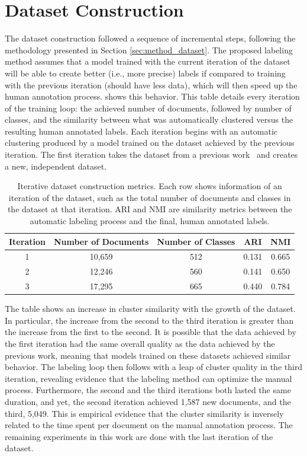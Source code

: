 \section{Dataset Construction}
\label{sec:res_dataset}

The dataset construction followed a sequence of incremental steps, following the methodology presented in Section \ref{sec:method_dataset}. The proposed labeling method assumes that a model trained with the current iteration of the dataset will be able to create better (i.e., more precise) labels if compared to training with the previous iteration (should have less data), which will then speed up the human annotation process.  shows this behavior. This table details every iteration of the training loop: the achieved number of documents, followed by number of classes, and the similarity between what was automatically clustered versus the resulting human annotated labels. Each iteration begins with an automatic clustering produced by a model trained on the dataset achieved by the previous iteration. The first iteration takes the dataset from a previous work~\cite{10.1007/978-3-032-09368-4_12} and creates a new, independent dataset.

\begin{table}[ht]
\centering
\caption{Iterative dataset construction metrics. Each row shows information of an iteration of the dataset, such as the total number of documents and classes in the dataset at that iteration. ARI and NMI are similarity metrics between the automatic labeling process and the final, human annotated labels.}
\label{tab:dataset_iterations}
\begin{tabular}{ccccc}
    \toprule
    Iteration & Number of Documents & Number of Classes & \gls{ARI} & \gls{NMI} \\
    \midrule
    1 & 10,659 & 512 & 0.131 & 0.665 \\
    2 & 12,246 & 560 & 0.141 & 0.650 \\
    3 & 17,295 & 665 & 0.440 & 0.784 \\
    \bottomrule
\end{tabular}
\end{table}

The table shows an increase in cluster similarity with the growth of the dataset. In particular, the increase from the second to the third iteration is greater than the increase from the first to the second. It is possible that the data achieved by the first iteration had the same overall quality as the data achieved by the previous work, meaning that models trained on these datasets achieved similar behavior. The labeling loop then follows with a leap of cluster quality in the third iteration, revealing evidence that the labeling method can optimize the manual process. Furthermore, the second and the third iterations both lasted the same duration, and yet, the second iteration achieved 1,587 new documents, and the third, 5,049. This is empirical evidence that the cluster similarity is inversely related to the time spent per document on the manual annotation process. The remaining experiments in this work are done with the last iteration of the dataset.

